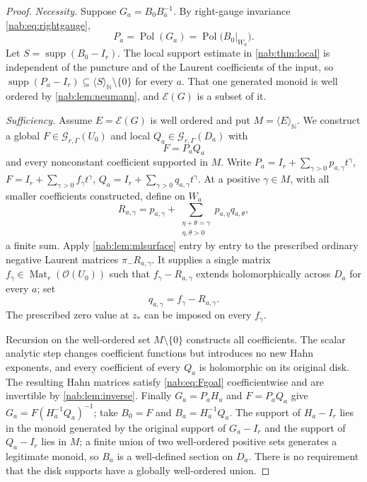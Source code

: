 \documentclass[11pt,letterpaper]{article}
\theoremstyle{definition}
\theoremstyle{remark}
\newcommand{\N}{\mathbb N}
\newcommand{\OO}{\mathcal O}
\newcommand{\GG}{\mathscr G_{r,\Gamma}}
\newcommand{\Mat}{\operatorname{Mat}}
\newcommand{\supp}{\operatorname{supp}}
\newcommand{\Pol}{\operatorname{Pol}}
\newcommand{\EU}{\mathcal E}
\newcommand{\angles}[1]{\langle #1\rangle_{\N}}
\numberwithin{equation}{section}
\begin{document}
\begin{proof}
\emph{Necessity.} Suppose $G_a=B_0B_a^{-1}$. By right-gauge invariance
\eqref{nab:eq:rightgauge},
\[
 P_a=\Pol(G_a)=\Pol\bigl(B_0|_{W_a}\bigr).
\]
Let $S=\supp(B_0-I_r)$. The local support estimate in \cref{nab:thm:local} is
independent of the puncture and of the Laurent coefficients of the input, so
$\supp(P_a-I_r)\subseteq\angles S\setminus\{0\}$ for every $a$. That one
generated monoid is well ordered by \cref{nab:lem:neumann}, and $\EU(G)$ is a
subset of it.

\emph{Sufficiency.} Assume $E=\EU(G)$ is well ordered and put $M=\angles E$.
We construct a global $F\in\GG(U_0)$ and local $Q_a\in\GG(D_a)$ with
\begin{equation}\label{nab:eq:Fgoal}
 F=P_aQ_a
\end{equation}
and every nonconstant coefficient supported in $M$. Write
$P_a=I_r+\sum_{\gamma>0}p_{a,\gamma}t^\gamma$,
$F=I_r+\sum_{\gamma>0}f_\gamma t^\gamma$,
$Q_a=I_r+\sum_{\gamma>0}q_{a,\gamma}t^\gamma$. At a positive $\gamma\in M$,
with all smaller coefficients constructed, define on $W_a$
\begin{equation}\label{nab:eq:globalrec}
 R_{a,\gamma}=p_{a,\gamma}+
 \sum_{\substack{\eta+\theta=\gamma\\ \eta,\theta>0}}p_{a,\eta}q_{a,\theta},
\end{equation}
a finite sum. Apply \cref{nab:lem:mlsurface} entry by entry to the prescribed
ordinary negative Laurent matrices $\pi_-R_{a,\gamma}$. It supplies a single
matrix $f_\gamma\in\Mat_r(\OO(U_0))$ such that $f_\gamma-R_{a,\gamma}$ extends
holomorphically across $D_a$ for every $a$; set
\begin{equation}\label{nab:eq:qrec}
 q_{a,\gamma}=f_\gamma-R_{a,\gamma}.
\end{equation}
The prescribed zero value at $z_*$ can be imposed on every $f_\gamma$.

Recursion on the well-ordered set $M\setminus\{0\}$ constructs all
coefficients. The scalar analytic step changes coefficient functions but
introduces no new Hahn exponents, and every coefficient of every $Q_a$ is
holomorphic on its original disk. The resulting Hahn matrices satisfy
\eqref{nab:eq:Fgoal} coefficientwise and are invertible by
\cref{nab:lem:inverse}. Finally $G_a=P_aH_a$ and $F=P_aQ_a$ give
$G_a=F(H_a^{-1}Q_a)^{-1}$; take $B_0=F$ and $B_a=H_a^{-1}Q_a$. The support of
$H_a-I_r$ lies in the monoid generated by the original support of $G_a-I_r$
and the support of $Q_a-I_r$ lies in $M$; a finite union of two well-ordered
positive sets generates a legitimate monoid, so $B_a$ is a well-defined
section on $D_a$. There is no requirement that the disk supports have a
globally well-ordered union.
\end{proof}
\end{document}

